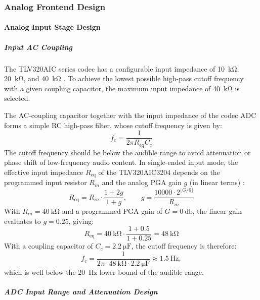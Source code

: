 \subsubsection{Analog Frontend Design}

\paragraph{Analog Input Stage Design}

\subparagraph{Input AC Coupling}
\label{sec:input-ac-coupling}

The TLV320AIC series codec has a configurable input impedance of \qty{10}{\kilo\ohm}, \qty{20}{\kilo\ohm}, and \qty{40}{\kilo\ohm} \cite{TLV320AIC3204ApplicationReference2012}.
To achieve the lowest possible high-pass cutoff frequency with a given coupling capacitor, the maximum input impedance of \qty{40}{\kilo\ohm} is selected.


The AC-coupling capacitor together with the input impedance of the codec ADC forms a simple RC high-pass filter, whose cutoff frequency is given by:
\begin{equation}
f_c = \frac{1}{2 \pi R_\text{eq} C_c}
\end{equation}
The cutoff frequency should be below the audible range to avoid attenuation or phase shift of low-frequency audio content.
In single-ended input mode, the effective input impedance $R_\text{eq}$ of the TLV320AIC3204 depends on the programmed input resistor $R_{in}$ and the analog \ac{PGA} gain $g$ (in linear terms) \cite{FAQTLV320AICCODECs2019}:
\begin{equation}
R_\text{eq} = R_{in} \cdot \frac{1 + 2g}{1 + g}, \qquad
g = \frac{10000 \cdot 2^{\lfloor G/6 \rfloor}}{R_{in}}
\end{equation}
With $R_{in} = \SI{40}{\kilo\ohm}$ and a programmed \ac{PGA} gain of $G = \SI{0}{\decibel}$, the linear gain evaluates to $g = 0.25$, giving:
\begin{equation}
R_\text{eq} = \SI{40}{\kilo\ohm} \cdot \frac{1 + 0.5}{1 + 0.25} = \SI{48}{\kilo\ohm}
\end{equation}
With a coupling capacitor of $C_c = \qty{2.2}{\micro\farad}$, the cutoff frequency is therefore:
\begin{equation}
f_c = \frac{1}{2\pi \cdot \SI{48}{\kilo\ohm} \cdot \qty{2.2}{\micro\farad}}
\approx \qty{1.5}{\hertz},
\end{equation}
which is well below the \qty{20}{\hertz} lower bound of the audible range.

\subparagraph{ADC Input Range and Attenuation Design}

